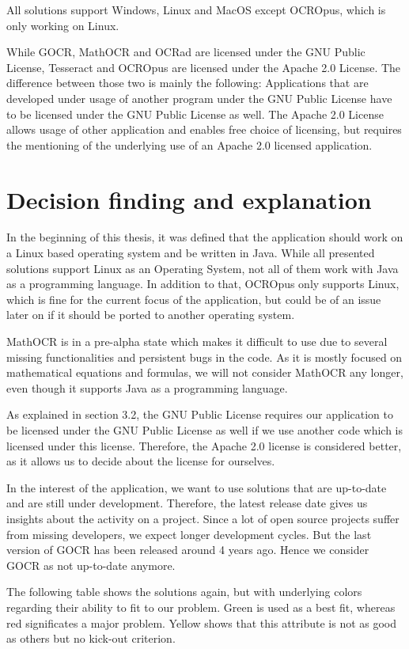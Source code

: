 All solutions support Windows, Linux and MacOS except OCROpus, which is only working on Linux.

While GOCR, MathOCR and OCRad are licensed under the GNU Public License, Tesseract and OCROpus are licensed under the Apache 2.0 License. The difference between those two is mainly the following: Applications that are developed under usage of another program under the GNU Public License have to be licensed under the GNU Public License as well. The Apache 2.0 License allows usage of other application and enables free choice of licensing, but requires the mentioning of the underlying use of an Apache 2.0 licensed application.


\label{OCRDecision}
\section{Decision finding and explanation}
In the beginning of this thesis, it was defined that the application should work on a Linux based operating system and be written in Java. While all presented solutions support Linux as an Operating System, not all of them work with Java as a programming language. In addition to that, OCROpus only supports Linux, which is fine for the current focus of the application, but could be of an issue later on if it should be ported to another operating system.

MathOCR is in a pre-alpha state which makes it difficult to use due to several missing functionalities and persistent bugs in the code. As it is mostly focused on mathematical equations and formulas, we will not consider MathOCR any longer, even though it supports Java as a programming language. 

As explained in section 3.2, the GNU Public License requires our application to be licensed under the GNU Public License as well if we use another code which is licensed under this license. Therefore, the Apache 2.0 license is considered better, as it allows us to decide about the license for ourselves.

In the interest of the application, we want to use solutions that are up-to-date and are still under development. Therefore, the latest release date gives us insights about the activity on a project. Since a lot of open source projects suffer from missing developers, we expect longer development cycles. But the last version of GOCR has been released around 4 years ago. Hence we consider GOCR as not up-to-date anymore.

The following table shows the solutions again, but with underlying colors regarding their ability to fit to our problem. Green is used as a best fit, whereas red significates a major problem. Yellow shows that this attribute is not as good as others but no kick-out criterion. 

